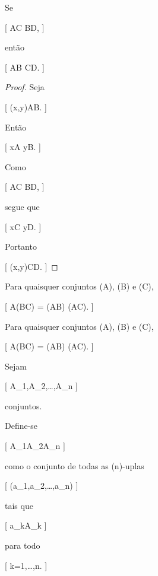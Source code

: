 \documentclass[../../main]{subfiles}
\begin{document}
\begin{prop}
	\label{prop:matematica:teoria-conjuntos:produto-cartesiano:monotonicidade}

	Se

		[
			A\subseteq C
			\quad\text{e}\quad
			B\subseteq D,
		]

	então

	[
	A\times B
	\subseteq
	C\times D.
	]

\end{prop}

\begin{proof}

	Seja

	[
	(x,y)\in A\times B.
	]

	Então

	[
	x\in A
	\quad{}\quad
	y\in B.
	]

	Como

		[
			A\subseteq C
			\quad\text{e}\quad
			B\subseteq D,
		]

	segue que

		[
			x\in C
			\quad\text{e}\quad
			y\in D.
		]

	Portanto

		[
			(x,y)\in C\times D.
		]

\end{proof}

\begin{prop}
	\label{prop:matematica:teoria-conjuntos:produto-cartesiano:distribuicao-uniao}

	Para quaisquer conjuntos (A), (B) e (C),

	[
			A\times(B\cup C)
			=
			(A\times B)
			\cup
			(A\times C).
		]

\end{prop}

\begin{prop}
	\label{prop:matematica:teoria-conjuntos:produto-cartesiano:distribuicao-intersecao}

	Para quaisquer conjuntos (A), (B) e (C),

	[
			A\times(B\cap C)
			=
			(A\times B)
			\cap
			(A\times C).
		]

\end{prop}

\begin{defn}
	\label{def:matematica:teoria-conjuntos:produto-cartesiano:produto-finito}

	Sejam

		[
			A_1,A_2,\dots,A_n
		]

	conjuntos.

	Define-se

	[
	A_1\times A_2\times\cdots\times A_n
	]

	como o conjunto de todas as (n)-uplas

	[
	(a_1,a_2,\dots,a_n)
	]

	tais que

		[
			a_k\in A_k
		]

	para todo

		[
			k=1,\dots,n.
		]

\end{defn}
\end{document}
